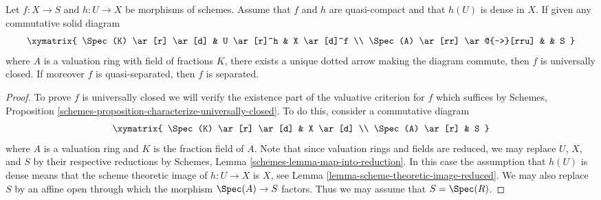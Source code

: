 \begin{lemma}
\label{lemma-refined-valuative-criterion-universally-closed}
Let $f : X \to S$ and $h : U \to X$ be morphisms of schemes.
Assume that $f$ and $h$ are quasi-compact and that $h(U)$ is dense in $X$.
If given any commutative solid diagram
$$
\xymatrix{
\Spec(K) \ar[r] \ar[d] & U \ar[r]^h & X \ar[d]^f \\
\Spec(A) \ar[rr] \ar@{-->}[rru] & & S
}
$$
where $A$ is a valuation ring with field of fractions $K$, there
exists a unique dotted arrow making the diagram commute, then $f$
is universally closed. If moreover $f$ is quasi-separated, then
$f$ is separated.
\end{lemma}

\begin{proof}
To prove $f$ is universally closed we will verify the existence part of the
valuative criterion for $f$ which suffices by
Schemes, Proposition \ref{schemes-proposition-characterize-universally-closed}.
To do this, consider a commutative diagram
$$
\xymatrix{
\Spec(K) \ar[r] \ar[d] & X \ar[d] \\
\Spec(A) \ar[r] & S
}
$$
where $A$ is a valuation ring and $K$ is the fraction field of $A$.
Note that since valuation rings and fields are reduced, we may
replace $U$, $X$, and $S$ by their respective reductions
by Schemes, Lemma \ref{schemes-lemma-map-into-reduction}.
In this case the assumption that $h(U)$ is dense means that
the scheme theoretic image of $h : U \to X$ is $X$, see
Lemma \ref{lemma-scheme-theoretic-image-reduced}.
We may also replace $S$ by an affine open through which
the morphism $\Spec(A) \to S$ factors. Thus we may
assume that $S = \Spec(R)$.


\end{proof}

